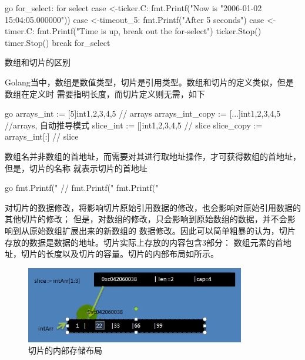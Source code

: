 \begin{outline}[enumerate]
\begin{code-in-enumerate}{go}
for_select:
for {
    select {
        case <-ticker.C:
            fmt.Printf("Now is %
                "2006-01-02 15:04:05.000000"))
        case <-timeout_5:
            fmt.Printf("After 5 seconds\n")
        case <-timer.C:
            fmt.Printf("Time is up, break out the for-select\n")
            ticker.Stop()
            timer.Stop()
            break for_select
    }
}
\end{code-in-enumerate}

  \1 数组和切片的区别

  Golang当中，数组是数值类型，切片是引用类型。数组和切片的定义类似，但是数组在定义时
  需要指明长度，而切片定义则无需，如下
\begin{code-in-enumerate}{go}
arrays_int := [5]int{1,2,3,4,5} // arrays
arrays_int_copy := [...]int{1,2,3,4,5} //arrays, 自动推导模式
slice_int := []int{1,2,3,4,5} // slice
slice_copy := arrays_int[:] // slice
\end{code-in-enumerate}

  数组名并非数组的首地址，而需要对其进行取地址操作，才可获得数组的首地址，但是，切片的名称
  就表示切片的首地址
\begin{code-in-enumerate}{go}
fmt.Printf("%
// fmt.Printf("%
fmt.Printf("%
\end{code-in-enumerate}

  对切片的数据修改，将影响切片原始引用数据的修改，也会影响对原始引用数据的其他切片的修改；
  但是，对数组的修改，只会影响到原始数组的数据，并不会影响到从原始数组扩展出来的新数组的
  数据修改。因此可以简单粗暴的认为，切片存放的数据是数据的地址。切片实际上存放的内容包含3部分：
  数组元素的首地址，切片的长度以及切片的容量。切片的内部布局如所示。
\begin{figure}[H]
  \centering
  \includegraphics[width=\linewidth]{slice.png}
  \caption{切片的内部存储布局}
  \label{fig:slice}
\end{figure}


\end{outline}
